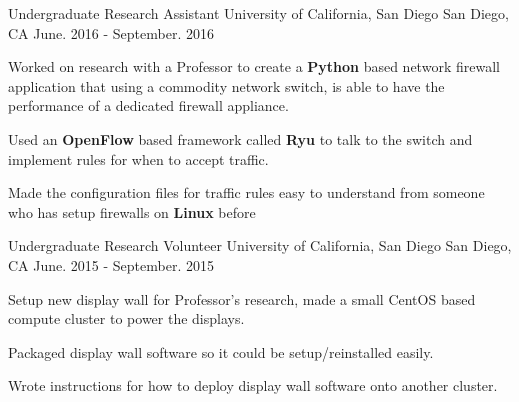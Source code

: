 \begin{cventries}
  
  \cventry
    {Undergraduate Research Assistant} %
    {University of California, San Diego} %
    {San Diego, CA} %
    {June. 2016 - September. 2016} %
    {
      \begin{cvitems} %
        \item {Worked on research with a Professor to create a \textbf{Python} based network firewall application that using  a commodity network switch, is able to have the performance of a dedicated firewall appliance.}
        \item {Used an \textbf{OpenFlow} based framework called \textbf{Ryu} to talk to the switch and implement rules for when to accept traffic.}
        \item {Made the configuration files for traffic rules easy to understand from someone who has setup firewalls on \textbf{Linux}
before}  \end{cvitems}
    }

  
  \cventry
    {Undergraduate Research Volunteer} %
    {University of California, San Diego} %
    {San Diego, CA} %
    {June. 2015 - September. 2015} %
    {
      \begin{cvitems} %
        \item {Setup new display wall for Professor's research, made a small CentOS based compute cluster to power the displays. }
        \item {Packaged display wall software so it could be setup/reinstalled easily.}
        \item {Wrote instructions for how to deploy display wall software onto another cluster.}  
       \end{cvitems}
    }


\end{cventries}
